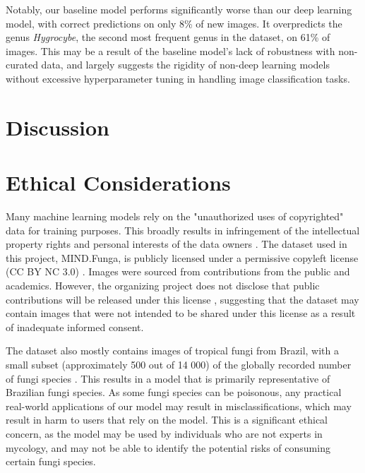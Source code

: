\documentclass{article} %
\begin{document}
Notably, our baseline model performs significantly worse than our deep learning model, with correct predictions on only 8\% of new images. It overpredicts the genus \textit{Hygrocybe}, the second most frequent genus in the dataset, on 61\% of images. This may be a result of the baseline model's lack of robustness with non-curated data, and largely suggests the rigidity of non-deep learning models without excessive hyperparameter tuning in handling image classification tasks.

\section{Discussion}
\label{sec:discussion}

\section{Ethical Considerations}
\label{sec:ethics}
Many machine learning models rely on the "unauthorized uses of copyrighted" data for training purposes. This broadly results in infringement of the intellectual property rights and personal interests of the data owners \citep{Sobel.TaxonomyTrainingData.2021}. The dataset used in this project, MIND.Funga, is publicly licensed under a permissive copyleft license (CC BY NC 3.0) \citep{Drechsler-SantosKarstedtEtAl.MINDFunga.2023}. Images were sourced from contributions from the public and academics. However, the organizing project does not disclose that public contributions will be released under this license \citep{Drechsler-SantosKarstedtEtAl.MINDFunga.2023}, suggesting that the dataset may contain images that were not intended to be shared under this license as a result of inadequate informed consent.

The dataset also mostly contains images of tropical fungi from Brazil, with a small subset (approximately 500 out of 14 000) of the globally recorded number of fungi species \citep{LuckingAimeEtAl.UnambiguousIdentificationFungi.2020}. This results in a model that is primarily representative of Brazilian fungi species. As some fungi species can be poisonous, any practical real-world applications of our model may result in misclassifications, which may result in harm to users that rely on the model. This is a significant ethical concern, as the model may be used by individuals who are not experts in mycology, and may not be able to identify the potential risks of consuming certain fungi species.

\label{last_page}



\end{document}
